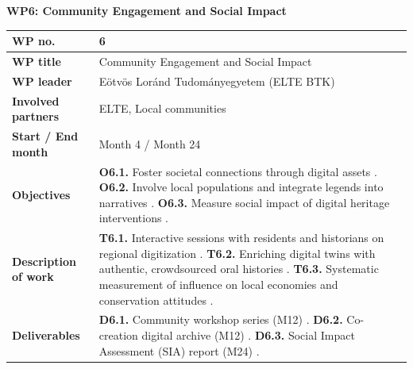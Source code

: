 \textbf{WP6: Community Engagement and Social Impact}

\begin{table}[H]
\centering
\small
\renewcommand{\arraystretch}{1.2}
\begin{tabularx}{\textwidth}{|l|X|}
\hline
\rowcolor{gray!10} \textbf{WP no.} & 6 \\ \hline
\textbf{WP title} & Community Engagement and Social Impact  \\ \hline
\textbf{WP leader} & Eötvös Loránd Tudományegyetem (ELTE BTK)  \\ \hline
\textbf{Involved partners} & ELTE, Local communities  \\ \hline
\textbf{Start / End month} & Month 4 / Month 24  \\ \hline
\textbf{Objectives} & \textbf{O6.1.} Foster societal connections through digital assets . \newline \textbf{O6.2.} Involve local populations and integrate legends into narratives . \newline \textbf{O6.3.} Measure social impact of digital heritage interventions . \\ \hline
\textbf{Description of work} & \textbf{T6.1.} Interactive sessions with residents and historians on regional digitization . \newline \textbf{T6.2.} Enriching digital twins with authentic, crowdsourced oral histories . \newline \textbf{T6.3.} Systematic measurement of influence on local economies and conservation attitudes . \\ \hline
\textbf{Deliverables} & \textbf{D6.1.} Community workshop series (M12) . \newline \textbf{D6.2.} Co-creation digital archive (M12) . \newline \textbf{D6.3.} Social Impact Assessment (SIA) report (M24) . \\ \hline
\end{tabularx}
\end{table}

